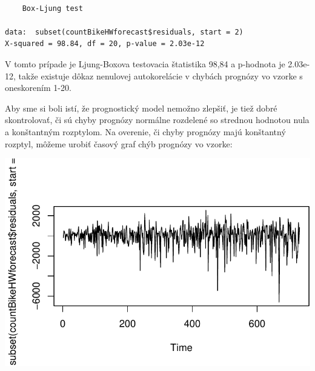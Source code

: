 \documentclass[
  letterpaper,
  DIV=11,
  numbers=noendperiod]{scrreprt}
\newenvironment{Shaded}{\begin{snugshade}}{\end{snugshade}}
\newcommand{\AttributeTok}[1]{\textcolor[rgb]{0.40,0.45,0.13}{#1}}
\newcommand{\DecValTok}[1]{\textcolor[rgb]{0.68,0.00,0.00}{#1}}
\newcommand{\FunctionTok}[1]{\textcolor[rgb]{0.28,0.35,0.67}{#1}}
\newcommand{\NormalTok}[1]{\textcolor[rgb]{0.00,0.23,0.31}{#1}}
\newcommand{\SpecialCharTok}[1]{\textcolor[rgb]{0.37,0.37,0.37}{#1}}
\newcommand{\StringTok}[1]{\textcolor[rgb]{0.13,0.47,0.30}{#1}}
\begin{document}
\begin{Shaded}
\end{Shaded}

\begin{verbatim}

    Box-Ljung test

data:  subset(countBikeHWforecast$residuals, start = 2)
X-squared = 98.84, df = 20, p-value = 2.03e-12
\end{verbatim}

V tomto prípade je Ljung-Boxova testovacia štatistika 98,84 a p-hodnota
je 2.03e-12, takže existuje dôkaz nenulovej autokorelácie v chybách
prognózy vo vzorke s oneskorením 1-20.

Aby sme si boli istí, že prognostický model nemožno zlepšiť, je tiež
dobré skontrolovať, či sú chyby prognózy normálne rozdelené so strednou
hodnotou nula a konštantným rozptylom. Na overenie, či chyby prognózy
majú konštantný rozptyl, môžeme urobiť časový graf chýb prognózy vo
vzorke:

\begin{Shaded}
\end{Shaded}

\includegraphics{prednaska2_HoltWinters_files/figure-pdf/unnamed-chunk-14-1.pdf}
\end{document}
